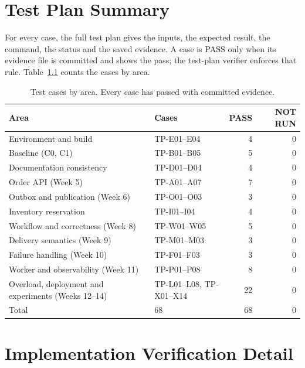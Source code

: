 \documentclass[a4paper]{report}
\begin{document}
\appendix
\chapter{Test Plan Summary}
\label{app:test-plan}

For every case, the full test plan gives the
inputs, the expected result, the command, the status and the saved evidence.
A case is PASS only when its evidence file is committed and shows the pass;
the test-plan verifier enforces that rule. Table~\ref{tab:app-tests}
counts the cases by area.

\begin{table}[H]
\centering
\small
\begin{tabular}{@{}p{}lrr@{}}
\toprule
Area & Cases & PASS & NOT RUN \\
\midrule
Environment and build & TP-E01--E04 & 4 & 0 \\
Baseline (C0, C1) & TP-B01--B05 & 5 & 0 \\
Documentation consistency & TP-D01--D04 & 4 & 0 \\
Order API (Week 5) & TP-A01--A07 & 7 & 0 \\
Outbox and publication (Week 6) & TP-O01--O03 & 3 & 0 \\
Inventory reservation & TP-I01--I04 & 4 & 0 \\
Workflow and correctness (Week 8) & TP-W01--W05 & 5 & 0 \\
Delivery semantics (Week 9) & TP-M01--M03 & 3 & 0 \\
Failure handling (Week 10) & TP-F01--F03 & 3 & 0 \\
Worker and observability (Week 11) & TP-P01--P08 & 8 & 0 \\
Overload, deployment and experiments (Weeks 12--14) & TP-L01--L08, TP-X01--X14 & 22 & 0 \\
\midrule
Total & 68 & 68 & 0 \\
\bottomrule
\end{tabular}
\caption{Test cases by area. Every case has passed with committed evidence.}
\label{tab:app-tests}
\end{table}

\chapter{Implementation Verification Detail}
\label{app:verification}
\end{document}
